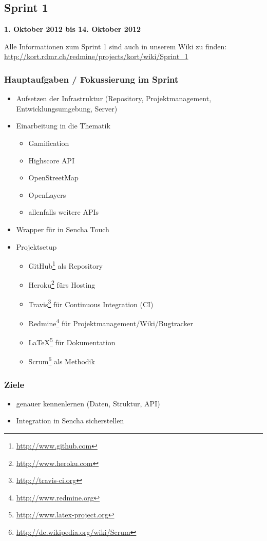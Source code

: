 \subsection{Sprint 1}

\textbf{1. Oktober 2012 bis 14. Oktober 2012}

Alle Informationen zum Sprint 1 sind auch in unserem Wiki zu finden:
\url{http://kort.rdmr.ch/redmine/projects/kort/wiki/Sprint_1}

\subsubsection{Hauptaufgaben / Fokussierung im Sprint}

\begin{itemize}
	\item Aufsetzen der Infrastruktur (Repository, Projektmanagement, Entwicklungsumgebung, Server)
	\item Einarbeitung in die Thematik
	\begin{itemize}
		\item \gls{Gamification}
		\item Highscore \gls{API}
		\item OpenStreetMap
		\item OpenLayers
		\item allenfalls weitere \glspl{API}
	\end{itemize}
	\item Wrapper für  in Sencha Touch
	\item Projektsetup
	\begin{itemize}
		\item GitHub\footnote{\url{http://www.github.com}} als Repository
		\item Heroku\footnote{\url{http://www.heroku.com}} fürs Hosting
		\item Travis\footnote{\url{http://travis-ci.org}} für Continuous Integration (CI)
		\item Redmine\footnote{\url{http://www.redmine.org}} für Projektmanagement/Wiki/Bugtracker
		\item \LaTeX{}\footnote{\url{http://www.latex-project.org}} für Dokumentation
		\item Scrum\footnote{\url{http://de.wikipedia.org/wiki/Scrum}} als Methodik
	\end{itemize}
\end{itemize}

\subsubsection{Ziele}
\begin{itemize}
	\item {} genauer kennenlernen (Daten, Struktur, \gls{API})
	\item Integration in Sencha sicherstellen
\end{itemize}

